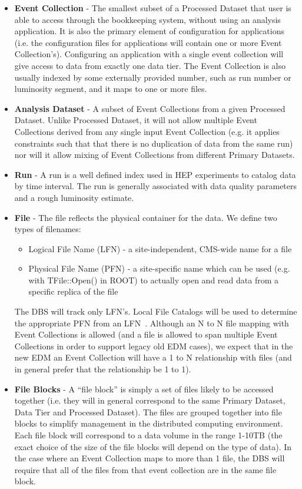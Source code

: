 \documentclass{cmspaper}
\begin{document}
\begin{itemize}
\item{\bf Event Collection} - The smallest subset of a Processed Dataset that
user is able to access through the bookkeeping system, without using an
analysis application. It is also the primary element of configuration for
applications (i.e. the configuration files for applications will contain
one or more Event Collection's). Configuring an application with a single
event collection will give access to data from exactly one data tier. The 
Event Collection is also usually indexed by some externally provided number, 
such as run number or luminosity segment, and it maps to one or more files. 

\item {\bf Analysis Dataset} - A subset of Event Collections from a given 
Processed Dataset. Unlike Processed Dataset, it will not allow multiple Event 
Collections derived from any single input Event Collection (e.g. it applies
constraints such that that there is no duplication of data from the same 
run) nor will it allow mixing of Event Collections from different Primary 
Datasets.

\item {\bf Run} - A run is a well defined index used in HEP experiments to 
catalog data by time interval. The run is generally associated with data
quality parameters and a rough luminosity estimate.

\item {\bf File} - The file reflects the physical container for the data. We 
define two types of filenames:
    \begin{itemize}
    \item Logical File Name (LFN) - a site-independent, CMS-wide name for
          a file
    \item Physical File Name (PFN) - a site-specific name which can be used
          (e.g. with TFile::Open() in ROOT) to actually open and read data
          from a specific replica of the file
    \end{itemize}
The DBS will track only LFN's. Local File Catalogs will be used to determine
the appropriate PFN from an LFN~\cite{CTDR}.
Although an N to N file mapping with Event Collections is allowed (and a file 
is allowed to span multiple Event Collections in order to support legacy old
EDM cases), we expect that in the new EDM an Event Collection will have a 1 to
N relationship with files (and in general prefer that the relationship be
1 to 1). 

\item {\bf File Blocks} - A ``file block'' is simply a set of files
likely to be accessed together (i.e. they will in general correspond to
the same Primary Dataset, Data Tier and Processed Dataset). The files are 
grouped together into file blocks to simplify management in the distributed 
computing environment. Each file block will correspond to a data volume in 
the range 1-10TB (the exact choice of the size of the file blocks will depend 
on the type of data). In the case where an Event Collection maps to more than
1 file, the DBS will require that all of the files from that event collection
are in the same file block.

\end{itemize} 
\end{document}
